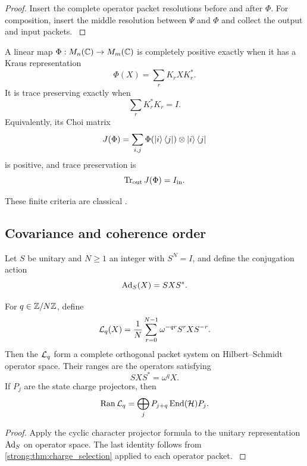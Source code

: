 \begin{proof}\label{strong:proof:032}
Insert the complete operator packet resolutions before and after \(\Phi\). For composition, insert the middle resolution between \(\Psi\) and \(\Phi\) and collect the output and input packets.
\label{strong:proof:032:end}\end{proof}

\begin{standardfact}\label{strong:standardfact:001}\label{strong:fact:kraus_choi}
A linear map \(\Phi:M_n(\CC)\to M_m(\CC)\) is completely positive exactly when it has a Kraus representation
\[
\Phi(X)=\sum_rK_rXK_r^*.
\]
It is trace preserving exactly when
\[
\sum_rK_r^*K_r=I.
\]
Equivalently, its Choi matrix
\[
J(\Phi)
=
\sum_{i,j}\Phi(\left|i\right\rangle\left\langle j\right|)\otimes\left|i\right\rangle\left\langle j\right|
\]
is positive, and trace preservation is
\[
\operatorname{Tr}_{\rm out}J(\Phi)=I_{\rm in}.
\]
\end{standardfact}

These finite criteria are classical \cite{Stinespring1955,Choi1975,Kraus1983,Watrous2018}.

\subsection{Covariance and coherence order}\label{strong:subsec:channel_covariance}

Let \(S\) be unitary and \(N\ge1\) an integer with \(S^N=I\), and define the conjugation action
\[
\operatorname{Ad}_S(X)=SXS^*.
\]

\begin{theorem}\label{strong:theorem:022}\label{strong:thm:coherence_projectors}
For \(q\in\ZZ/N\ZZ\), define
\[
\Lcal_q(X)
=
\frac1N
\sum_{r=0}^{N-1}
\omega^{-qr}S^rXS^{-r}.
\]
Then the \(\Lcal_q\) form a complete orthogonal packet system on Hilbert--Schmidt operator space. Their ranges are the operators satisfying
\[
SXS^*=\omega^qX.
\]
If \(P_j\) are the state charge projectors, then
\[
\Ran\Lcal_q
=
\bigoplus_jP_{j+q}\End(\Hcal)P_j.
\]
\end{theorem}

\begin{proof}\label{strong:proof:033}
Apply the cyclic character projector formula to the unitary representation \(\operatorname{Ad}_S\) on operator space. The last identity follows from \cref{strong:thm:charge_selection} applied to each operator packet.
\label{strong:proof:033:end}\end{proof}

